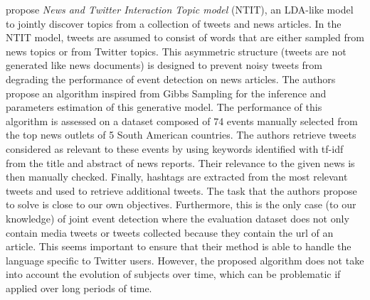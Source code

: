 \cite{hua_topical_2016} propose \textit{News
and Twitter Interaction Topic model} (NTIT), an LDA-like model to jointly discover topics from a collection of tweets and news articles. In the NTIT model, tweets are assumed to consist of words that are either sampled from news topics or from Twitter
topics. This asymmetric structure (tweets are not generated like news documents) is designed to prevent noisy tweets from degrading the performance of event detection on news articles.
The authors propose an algorithm inspired from Gibbs Sampling \citep{welling_hybrid_2008} for the inference and parameters estimation of this generative model. The performance of this algorithm is assessed on a dataset composed of 74 events manually selected from the top news outlets of 5 South American countries. The authors retrieve tweets considered as relevant to these events by using keywords identified with tf-idf from the title and abstract of news reports. Their relevance to the given news is then manually checked. Finally, hashtags are extracted from the most relevant tweets and used to retrieve additional tweets. The task that the authors propose to solve is close to our own objectives. Furthermore, this is the only case (to our knowledge) of joint event detection where the evaluation dataset does not only contain media tweets or tweets collected because they contain the url of an article. This seems important to ensure that their method is able to handle the language specific to Twitter users. However, the proposed algorithm does not take into account the evolution of subjects over time, which can be problematic if applied over long periods of time.

